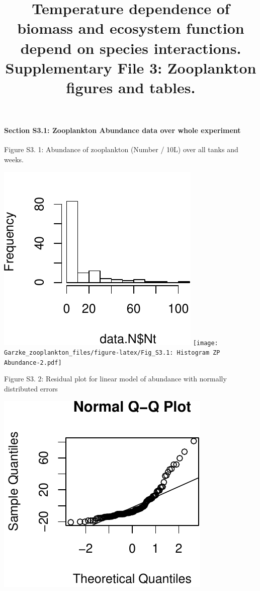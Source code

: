 \documentclass[]{article}
\title{Temperature dependence of biomass and ecosystem function depend on
species interactions. Supplementary File 3: Zooplankton figures and
tables.}
\author{}
\date{}
\let\oldparagraph\paragraph
\renewcommand{\paragraph}[1]{\oldparagraph{#1}\mbox{}}
\begin{document}
\maketitle

\paragraph{Section S3.1: Zooplankton Abundance data over whole
experiment}\label{section-s3.1-zooplankton-abundance-data-over-whole-experiment}

Figure S3. 1: Abundance of zooplankton (Number / 10L) over all tanks and
weeks.

\includegraphics{Garzke_zooplankton_files/figure-latex/Fig_S3.1: Histogram ZP Abundance-1.pdf}
\texttt{[image: Garzke\_zooplankton\_files/figure-latex/Fig\_S3.1: Histogram ZP Abundance-2.pdf]}

Figure S3. 2: Residual plot for linear model of abundance with normally
distributed errors

\includegraphics{Garzke_zooplankton_files/figure-latex/resid_plot_lm-1.pdf}
\end{document}
